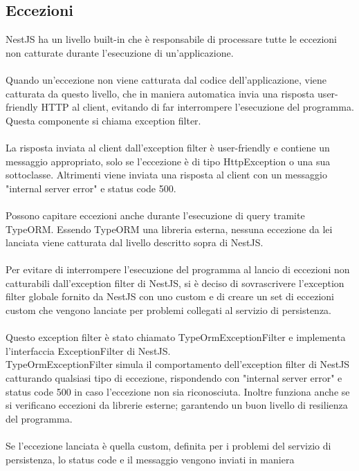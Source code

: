 \subsection{Eccezioni}
NestJS ha un livello built-in che è responsabile di processare tutte le eccezioni non catturate durante 
l'esecuzione di un'applicazione.
\\\\
Quando un'eccezione non viene catturata dal codice dell'applicazione, viene catturata da questo livello,
che in maniera automatica invia una risposta user-friendly \gls{HTTP} al client, evitando di far interrompere 
l'esecuzione del programma. Questa componente si chiama exception filter.
\\\\
La risposta inviata al client dall'exception filter è user-friendly e contiene un messaggio appropriato, solo se l'eccezione è di tipo HttpException o 
una sua sottoclasse. 
Altrimenti viene inviata una risposta al client con un messaggio "internal server error" e status code 500.
\\\\
Possono capitare eccezioni anche durante l'esecuzione di query tramite TypeORM. Essendo TypeORM una libreria
esterna, nessuna eccezione da lei lanciata viene catturata dal livello descritto sopra di NestJS.
\\\\
Per evitare di interrompere l'esecuzione del programma al lancio di eccezioni non catturabili dall'exception filter di NestJS,
 si è deciso di 
sovrascrivere l'exception filter globale fornito da NestJS con uno custom e di creare un set di eccezioni
custom che vengono lanciate per problemi collegati al servizio di persistenza.
\\\\
Questo exception filter è stato chiamato TypeOrmExceptionFilter e implementa l'interfaccia ExceptionFilter di
NestJS. 
\\
TypeOrmExceptionFilter simula il comportamento dell'exception filter di NestJS catturando qualsiasi
tipo di eccezione, rispondendo con "internal server error" e status code 500 in caso l'eccezione non sia riconosciuta.
Inoltre funziona anche se si verificano eccezioni da librerie esterne; garantendo un buon livello di resilienza
del programma. 
\\\\
Se l'eccezione lanciata è quella custom, definita per i problemi del servizio di persistenza, lo status code e il messaggio 
vengono inviati in maniera
